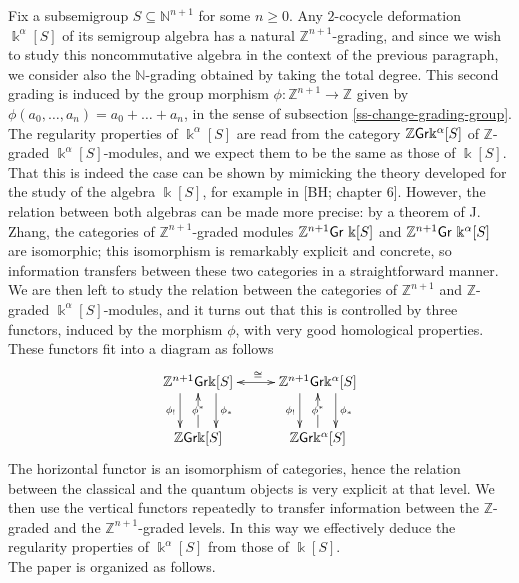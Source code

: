 \documentclass[twoside,11pt]{article}
\renewcommand{\k}{\Bbbk}
\newcommand{\N}{{\mathbb N}}
\newcommand{\Z}{{\mathbb Z}}
\newcommand{\GrMod}{{\sf Gr}}
\begin{document}
Fix a subsemigroup $S \subseteq \N^{n+1}$ for some $n \geq 0$. Any $2$-cocycle deformation
$\k^\alpha[S]$ of its semigroup algebra has a natural $\Z^{n+1}$-grading, and since we wish
to study this noncommutative algebra in the context of the previous paragraph, we consider
also the $\N$-grading obtained by taking the total degree. This second grading is induced
by the group morphism $\phi: \Z^{n+1} \to \Z$ given by $\phi(a_0, \ldots, a_n) = a_0 +
\ldots + a_n$, in the sense of subsection \ref{ss-change-grading-group}. The regularity
properties of $\k^\alpha[S]$ are read from the category $\Z\GrMod \k^\alpha[S]$ of
$\Z$-graded $\k^\alpha[S]$-modules, and we expect them to be the same as those of $\k[S]$.
That this is indeed the case can be shown by mimicking the theory developed for the study
of the algebra  $\k[S]$, for example in [BH; chapter 6]. However, the relation between
both algebras can be made more precise: by a theorem of J. Zhang, the categories of
$\Z^{n+1}$-graded modules $\Z^{n+1}\GrMod~\k[S]$ and $\Z^{n+1}\GrMod~\k^\alpha[S]$ are
isomorphic; this
isomorphism is remarkably explicit and concrete, so information transfers between these
two categories in a straightforward manner. We are then left to study the relation between
the categories of $\Z^{n+1}$ and $\Z$-graded $\k^\alpha[S]$-modules, and it turns out that
this is controlled by three functors, induced by the morphism $\phi$, with very good
homological properties. These functors fit into a diagram as follows
\[
\xymatrix@!C{
	\Z^{n+1}\GrMod\k[S] \ar@{<->}[r]^{\cong}  \ar@{->}[d]<-3ex>_{\phi_!}
	\ar@{<-}[d]|{\phi^*} \ar@{->}[d]<3ex>^{\phi_*}
	&\Z^{n+ 1}\GrMod \k^\alpha[S] \ar@{->}[d]<-3ex>_{\phi_!} \ar@{<-}[d]|{\phi^*}
	\ar@{->}[d]<3ex>^{\phi_*} \\
	\Z\GrMod \k[S]  
	& \Z\GrMod\k^\alpha[S]  \\
} 
\]
The horizontal functor is an isomorphism of categories, hence the relation between the classical and the 
quantum objects is
very explicit at that level. 
We then use the vertical functors repeatedly to transfer information between the $\Z$-graded
and the $\Z^{n+1}$-graded levels. In this way we effectively deduce the regularity
properties of $\k^\alpha[S]$ from those of $\k[S]$.\\

The paper is organized as follows. 
\end{document}
